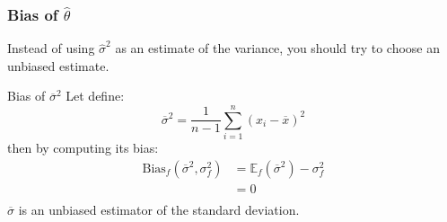 \frame
{
\frametitle{Bias of $\hat{\theta}$}

Instead of using $\hat{\sigma}^2$ as an estimate of the variance, you should try to choose an unbiased estimate. 

\begin{exampleblock}{Bias of $\overline{\sigma}^2$}
Let define:
$$ 
\overline{\sigma}^2=\frac{1}{n-1} \sum_{i=1}^{n} (x_i-\overline{x})^{2}
$$
then by computing its bias:
$$
\begin{array}{ll}
\mathrm{Bias}_f(\overline{\sigma}^2,\sigma_f^2)&=\mathbb{E}_{f}(\overline{\sigma}^2)-\sigma_f^2\\
&=0\\
\end{array}
$$
$\overline{\sigma}$ is an unbiased estimator of the standard deviation.
\end{exampleblock}


}
